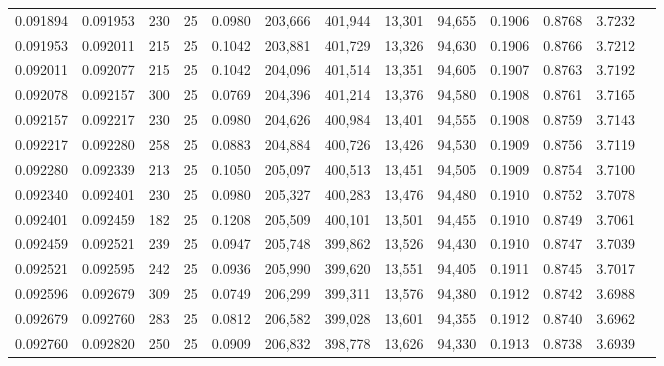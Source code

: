 \begin{tabular}{rrrrrrrrrrrrr}
0.091894 & 0.091953 &   230 &  25 &                                     0.0980 & 203,666 & 401,944 &  13,301 &  94,655 & 0.1906 & 0.8768 & 3.7232 \\
0.091953 & 0.092011 &   215 &  25 &                                     0.1042 & 203,881 & 401,729 &  13,326 &  94,630 & 0.1906 & 0.8766 & 3.7212 \\
0.092011 & 0.092077 &   215 &  25 &                                     0.1042 & 204,096 & 401,514 &  13,351 &  94,605 & 0.1907 & 0.8763 & 3.7192 \\
0.092078 & 0.092157 &   300 &  25 &                                     0.0769 & 204,396 & 401,214 &  13,376 &  94,580 & 0.1908 & 0.8761 & 3.7165 \\
0.092157 & 0.092217 &   230 &  25 &                                     0.0980 & 204,626 & 400,984 &  13,401 &  94,555 & 0.1908 & 0.8759 & 3.7143 \\
0.092217 & 0.092280 &   258 &  25 &                                     0.0883 & 204,884 & 400,726 &  13,426 &  94,530 & 0.1909 & 0.8756 & 3.7119 \\
0.092280 & 0.092339 &   213 &  25 &                                     0.1050 & 205,097 & 400,513 &  13,451 &  94,505 & 0.1909 & 0.8754 & 3.7100 \\
0.092340 & 0.092401 &   230 &  25 &                                     0.0980 & 205,327 & 400,283 &  13,476 &  94,480 & 0.1910 & 0.8752 & 3.7078 \\
0.092401 & 0.092459 &   182 &  25 &                                     0.1208 & 205,509 & 400,101 &  13,501 &  94,455 & 0.1910 & 0.8749 & 3.7061 \\
0.092459 & 0.092521 &   239 &  25 &                                     0.0947 & 205,748 & 399,862 &  13,526 &  94,430 & 0.1910 & 0.8747 & 3.7039 \\
0.092521 & 0.092595 &   242 &  25 &                                     0.0936 & 205,990 & 399,620 &  13,551 &  94,405 & 0.1911 & 0.8745 & 3.7017 \\
0.092596 & 0.092679 &   309 &  25 &                                     0.0749 & 206,299 & 399,311 &  13,576 &  94,380 & 0.1912 & 0.8742 & 3.6988 \\
0.092679 & 0.092760 &   283 &  25 &                                     0.0812 & 206,582 & 399,028 &  13,601 &  94,355 & 0.1912 & 0.8740 & 3.6962 \\
0.092760 & 0.092820 &   250 &  25 &                                     0.0909 & 206,832 & 398,778 &  13,626 &  94,330 & 0.1913 & 0.8738 & 3.6939 \\

\end{tabular}
